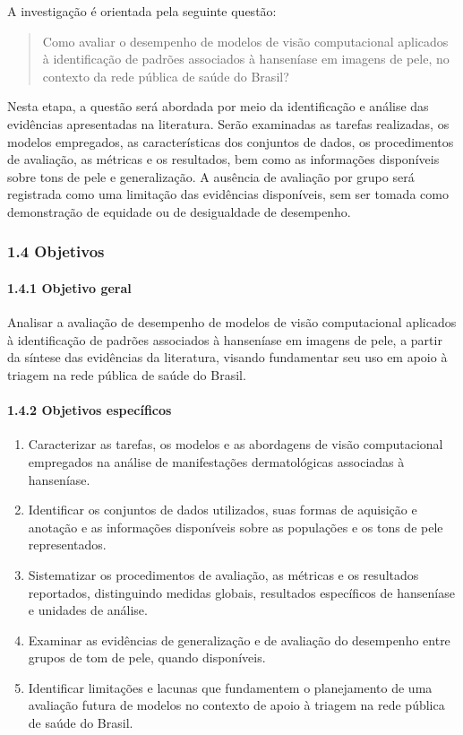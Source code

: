 \documentclass[
]{article}
\providecommand{\tightlist}{%
  \setlength{\itemsep}{0pt}\setlength{\parskip}{0pt}}
\begin{document}
A investigação é orientada pela seguinte questão:

\begin{quote}
Como avaliar o desempenho de modelos de visão computacional aplicados à
identificação de padrões associados à hanseníase em imagens de pele, no
contexto da rede pública de saúde do Brasil?
\end{quote}

Nesta etapa, a questão será abordada por meio da identificação e análise
das evidências apresentadas na literatura. Serão examinadas as tarefas
realizadas, os modelos empregados, as características dos conjuntos de
dados, os procedimentos de avaliação, as métricas e os resultados, bem
como as informações disponíveis sobre tons de pele e generalização. A
ausência de avaliação por grupo será registrada como uma limitação das
evidências disponíveis, sem ser tomada como demonstração de equidade ou
de desigualdade de desempenho.

\subsubsection{1.4 Objetivos}\label{objetivos}

\paragraph{1.4.1 Objetivo geral}\label{objetivo-geral}

Analisar a avaliação de desempenho de modelos de visão computacional
aplicados à identificação de padrões associados à hanseníase em imagens
de pele, a partir da síntese das evidências da literatura, visando
fundamentar seu uso em apoio à triagem na rede pública de saúde do
Brasil.

\paragraph{1.4.2 Objetivos específicos}\label{objetivos-especuxedficos}

\begin{enumerate}
\def\labelenumi{\arabic{enumi}.}
\tightlist
\item
  Caracterizar as tarefas, os modelos e as abordagens de visão
  computacional empregados na análise de manifestações dermatológicas
  associadas à hanseníase.
\item
  Identificar os conjuntos de dados utilizados, suas formas de aquisição
  e anotação e as informações disponíveis sobre as populações e os tons
  de pele representados.
\item
  Sistematizar os procedimentos de avaliação, as métricas e os
  resultados reportados, distinguindo medidas globais, resultados
  específicos de hanseníase e unidades de análise.
\item
  Examinar as evidências de generalização e de avaliação do desempenho
  entre grupos de tom de pele, quando disponíveis.
\item
  Identificar limitações e lacunas que fundamentem o planejamento de uma
  avaliação futura de modelos no contexto de apoio à triagem na rede
  pública de saúde do Brasil.
\end{enumerate}
\end{document}
